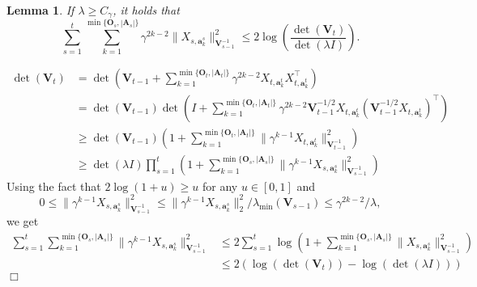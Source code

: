\documentclass{article}
\newcommand{\bA}{\mathbf{A}}
\newcommand{\ba}{\mathbf{a}}
\newcommand{\bO}{\mathbf{O}}
\newcommand{\bV}{\mathbf{V}}
\newcommand{\abs}[1]{\left| #1 \right|}
\newcommand{\norm}[1]{\| #1 \|}
\newtheorem{lemma}[theorem]{Lemma}%
\newenvironment{proof}{\noindent {\textbf{Proof. }}}{$\Box$ \medskip}
\begin{document}
\begin{lemma}
	If $\lambda \geq C_\gamma$, it holds that
	$$
	\sum_{s=1}^t \sum_{k=1}^{\min\{\bO_s, \abs{\bA_s}\}}\gamma^{2k-2}\norm{X_{s,\ba_{k}^s}}_{\bV_{s-1}^{-1}}^2 \leq 2\log(\frac{\det(\bV_t)}{\det(\lambda I)}).
	$$
\end{lemma}
\begin{proof}
	\begin{align*}
	\det(\bV_t) &= \det(\bV_{t-1} + \sum_{k=1}^{\min\{\bO_t, \abs{\bA_t}\}} \gamma^{2k-2}X_{t,\ba_k^{t}}X_{t, \ba_k^{t}}^{\top})\\
	&=\det(\bV_{t-1})\det(I + \sum_{k=1}^{\min\{\bO_t, \abs{\bA_t}\}} \gamma^{2k-2}\bV_{t-1}^{-1/2}X_{t,\ba_{k}^{t}} (\bV_{t-1}^{-1/2}X_{t,\ba_{k}^{t}})^{\top})\\
	&\geq \det(\bV_{t-1}) (1 + \sum_{k=1}^{\min\{\bO_t, \abs{\bA_t}\}} \norm{\gamma^{k-1}X_{t,\ba_k^t}}_{\bV_{t-1}^{-1}}^2)\\
	&\geq \det(\lambda I)\prod_{s=1}^{t}(1 + \sum_{k=1}^{\min\{\bO_s, \abs{\bA_s}\}} \norm{\gamma^{k-1}X_{s,\ba_k^s}}_{\bV_{s-1}^{-1}}^2)
	\end{align*}
	Using the fact that $ 2\log(1+u) \geq u$ for any $u \in [0,1]$ and 
	$$
	0 \leq \norm{\gamma^{k-1}X_{s,\ba_k^s}}_{\bV_{s-1}^{-1}}^2 \leq \norm{\gamma^{k-1}X_{s,\ba_k^s}}_2^2/\lambda_{\min}(\bV_{s-1}) \leq \gamma^{2k-2}/\lambda,
	$$
	we get
	\begin{align*}
	\sum_{s=1}^t \sum_{k=1}^{\min\{\bO_s, \abs{\bA_s}\}}\norm{\gamma^{k-1}X_{s,\ba_{k}^s}}_{\bV_{s-1}^{-1}}^2 &\leq 2\sum_{s=1}^t\log(1 + \sum_{k=1}^{\min\{\bO_s, \abs{\bA_s}\}} \norm{X_{s,\ba_k^s}}_{\bV_{s-1}^{-1}}^2)\\
	&\leq 2(\log(\det(\bV_t)) - \log(\det(\lambda I)))
	\end{align*}
\end{proof}
	
	
	\nocite{langley00}
	
	
	
	
\end{document}
